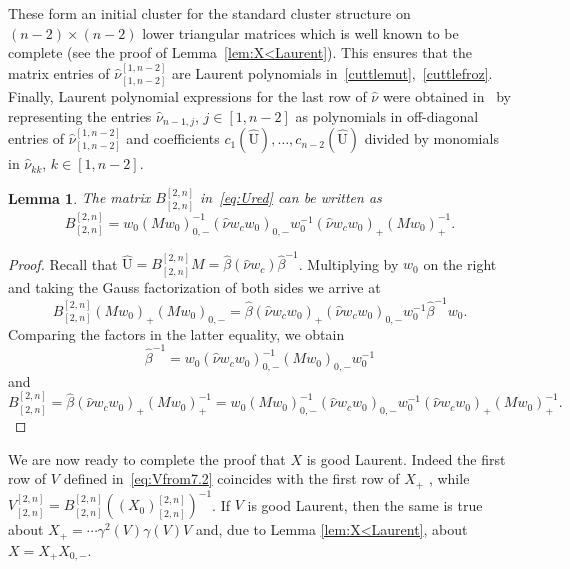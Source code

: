 \documentclass{amsart}
\newtheorem{lemma}[theorem]{Lemma}
\theoremstyle{definition}
\theoremstyle{remark}
\numberwithin{equation}{section}
\numberwithin{theorem}{section}
\def\UU{\mathrm U}
\begin{document}
These form an initial cluster for the standard cluster structure on $(n-2)\times(n-2)$ lower triangular matrices which is well known to be complete (see the proof of Lemma~\ref{lem:X<Laurent}).  This ensures that the matrix entries of 
 $\hat{\nu}_{[1,n-2]}^{[1,n-2]}$ are Laurent polynomials in~\eqref{cuttlemut},~\eqref{cuttlefroz}.
Finally, Laurent polynomial expressions for 
the last row of $\hat{\nu}$ were obtained in~\cite[Section 7.3.2]{GSVdouble} by representing the entries 
$\hat{\nu}_{n-1,j}$,  $j\in[1, n-2]$ as polynomials in off-diagonal entries of $\hat{\nu}_{[1,n-2]}^{[1,n-2]}$ and coefficients $c_1(\widehat{\UU}),\ldots, c_{n-2}(\widehat{\UU})$ divided by monomials in $\hat\nu_{kk}$,  $k\in [1,n-2]$.

\begin{lemma}
\label{lem:B+}
The matrix $B_{[2,n]}^{[2,n]}$ in~\eqref{eq:Ured} can be written as 
\[
B_{[2,n]}^{[2,n]}= w_0 (M w_0)^{-1}_{0,-} (\hat\nu w_cw_0)_{0,-} w_0^{-1} (\hat\nu w_cw_0)_+(M w_0)_+^{-1}.
\]
\end{lemma}

\begin{proof} Recall that $\widehat{\UU} = B^{[2,n]}_{[2,n]} M = \hat\beta  (\hat\nu w_c)  {\hat\beta}^{-1}$. Multiplying by $w_0$ on the right and taking the Gauss factorization of both sides we arrive at
\[
B^{[2,n]}_{[2,n]} (M w_0)_+ (M w_0)_{0,-} = \hat\beta  (\hat\nu w_c w_0)_+  (\hat\nu w_c w_0)_{0,-} w_0^{-1}  {\hat\beta}^{-1} w_0.
\]
Comparing the factors in the latter equality, we obtain
\[
\hat\beta^{-1} = w_0 (\hat\nu w_c w_0)_{0,-}^{-1} (M w_0)_{0,-}  w_0^{-1} 
\]
and
\[
B^{[2,n]}_{[2,n]}= \hat\beta (\hat\nu w_c w_0)_+ (M w_0)_+^{-1} = w_0 (M w_0)^{-1}_{0,-} (\hat\nu w_cw_0)_{0,-} w_0^{-1} (\hat\nu w_cw_0)_+(M w_0)_+^{-1}.
\]
\end{proof}

We are now ready to complete the proof that $X$ is good Laurent.
Indeed the first row of $V$ defined in~\eqref{eq:Vfrom7.2} coincides with the first row of $X_+$ , while
$V_{[2,n]}^{[2,n]}=B^{[2,n]}_{[2,n]} \left ((X_0)^{[2,n]}_{[2,n]} \right )^{-1}$. 
If $V$ is good Laurent, then the same is true about $X_+= \cdots \gamma^2(V) \gamma(V) V$ and, due to Lemma \ref{lem:X<Laurent}, about $X= X_+ X_{0,-}$.
\end{document}
